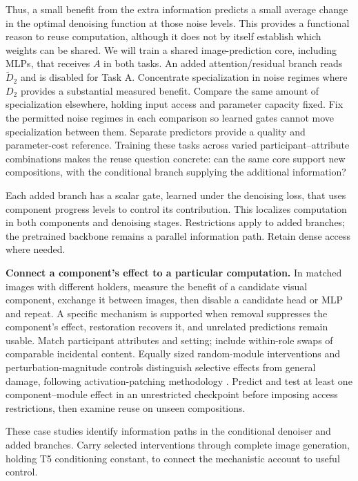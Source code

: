 \documentclass[11pt,letterpaper]{article}
\begin{document}
Thus, a small benefit from the extra information predicts a small average change in the optimal denoising function at those noise levels. This provides a functional reason to reuse computation, although it does not by itself establish which weights can be shared. We will train a shared image-prediction core, including MLPs, that receives \(A\) in both tasks. An added attention/residual branch reads \(\widetilde D_2\) and is disabled for Task A. Concentrate specialization in noise regimes where \(D_2\) provides a substantial measured benefit. Compare the same amount of specialization elsewhere, holding input access and parameter capacity fixed. Fix the permitted noise regimes in each comparison so learned gates cannot move specialization between them. Separate predictors provide a quality and parameter-cost reference. Training these tasks across varied participant--attribute combinations makes the reuse question concrete: can the same core support new compositions, with the conditional branch supplying the additional information?

Each added branch has a scalar gate, learned under the denoising loss, that uses component progress levels to control its contribution. This localizes computation in both components and denoising stages. Restrictions apply to added branches; the pretrained backbone remains a parallel information path. Retain dense access where needed.

\textbf{Connect a component's effect to a particular computation.} In matched images with different holders, measure the benefit of a candidate visual component, exchange it between images, then disable a candidate head or MLP and repeat. A specific mechanism is supported when removal suppresses the component's effect, restoration recovers it, and unrelated predictions remain usable. Match participant attributes and setting; include within-role swaps of comparable incidental content. Equally sized random-module interventions and perturbation-magnitude controls distinguish selective effects from general damage, following activation-patching methodology \citep{patching}. Predict and test at least one component--module effect in an unrestricted checkpoint before imposing access restrictions, then examine reuse on unseen compositions.

These case studies identify information paths in the conditional denoiser and added branches. Carry selected interventions through complete image generation, holding T5 conditioning constant, to connect the mechanistic account to useful control.
\end{document}
